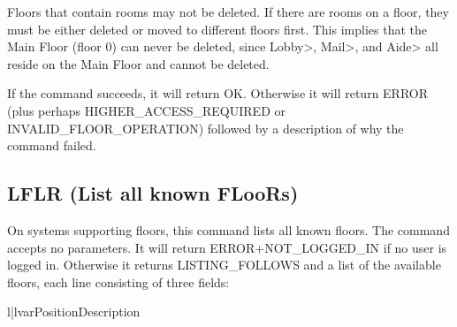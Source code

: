  Floors that contain rooms may not be deleted.  If there are rooms on a floor,
they must be either deleted or moved to different floors first.  This implies
that the Main Floor (floor 0) can never be deleted, since Lobby>, Mail>, and
Aide> all reside on the Main Floor and cannot be deleted.

 If the command succeeds, it will return OK.  Otherwise it will return
ERROR (plus perhaps HIGHER_ACCESS_REQUIRED or INVALID_FLOOR_OPERATION)
followed by a description of why the command failed.



\subsection{LFLR (List all known FLooRs)}

 On systems supporting floors, this command lists all known floors.  The
command accepts no parameters.  It will return ERROR+NOT_LOGGED_IN if no
user is logged in.  Otherwise it returns LISTING_FOLLOWS and a list of
the available floors, each line consisting of three fields:

\begin{tableii}{l|l}{var}{Position}{Description}




\end{tableii}



